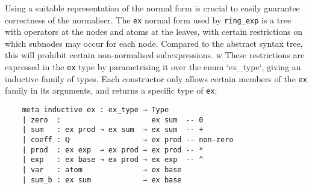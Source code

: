 \documentclass{llncs}
\newcommand{\lean}[1]{\texttt{#1}\xspace} %
\newcommand{\ex}{\lean{ex}}
\newcommand{\ring}{\lean{ring}}
\newcommand{\ringexp}{\lean{ring\_exp}}
\begin{document}

Using a suitable representation of the normal form is crucial to easily guarantee correctness of the normaliser.
The \ex normal form used by \ringexp is a tree with operators at the nodes and atoms at the leaves,
with certain restrictions on which subnodes may occur for each node.
Compared to the abstract syntax tree, this will prohibit certain non-normalised subexpressions.
w%
These restrictions are expressed in the \ex type by parametrising it over the enum `ex\_type`,
giving an inductive family of types.
Each constructor only allows certain members of the \ex family in its arguments,
and returns a specific type of \ex:

\begin{lstlisting}
	meta inductive ex : ex_type → Type
	| zero  :                     ex sum  -- 0
	| sum   : ex prod → ex sum  → ex sum  -- +
	| coeff : ℚ                 → ex prod -- non-zero
	| prod  : ex exp  → ex prod → ex prod -- *
	| exp   : ex base → ex prod → ex exp  -- ^
	| var   : atom              → ex base
	| sum_b : ex sum            → ex base
\end{lstlisting} %
\end{document}
